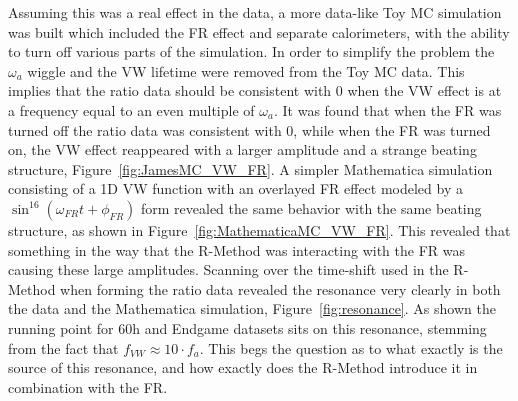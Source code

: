 \documentclass[12pt,letterpaper]{article}
\newcommand{\figref}[1]{Figure~\ref{#1}}
\def\wa{$\omega_{a}$\xspace}
\begin{document}
Assuming this was a real effect in the data, a more data-like Toy MC simulation was built which included the FR effect and separate calorimeters, with the ability to turn off various parts of the simulation. In order to simplify the problem the \wa wiggle and the VW lifetime were removed from the Toy MC data. This implies that the ratio data should be consistent with 0 when the VW effect is at a frequency equal to an even multiple of \wa. It was found that when the FR was turned off the ratio data was consistent with 0, while when the FR was turned on, the VW effect reappeared with a larger amplitude and a strange beating structure, \figref{fig:JamesMC_VW_FR}. A simpler Mathematica simulation consisting of a 1D VW function with an overlayed FR effect modeled by a $\sin^{16}(\omega_{FR}t + \phi_{FR})$ form revealed the same behavior with the same beating structure, as shown in \figref{fig:MathematicaMC_VW_FR}. This revealed that something in the way that the R-Method was interacting with the FR was causing these large amplitudes. Scanning over the time-shift used in the R-Method when forming the ratio data revealed the resonance very clearly in both the data and the Mathematica simulation, \figref{fig:resonance}. As shown the running point for 60h and Endgame datasets sits on this resonance, stemming from the fact that $f_{VW} \approx 10 \cdot f_{a}$. This begs the question as to what exactly is the source of this resonance, and how exactly does the R-Method introduce it in combination with the FR.
\end{document}
